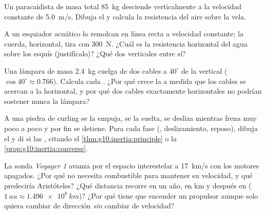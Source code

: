\begin{exercise}[$\star\star$]\label{exo:g10:inertia:10}
Un paracaidista de masa total \qty{85}{kg} desciende verticalmente a la
velocidad constante de \qty{5.0}{m/s}. Dibuja el  y
calcula la resistencia del aire sobre la vela.
\end{exercise}

\begin{exercise}[$\star\star$]\label{exo:g10:inertia:11}
A un esquiador acuático lo remolcan en línea recta a velocidad
constante; la cuerda, horizontal, tira con \qty{300}{N}. ¿Cuál es la
resistencia horizontal del agua sobre los esquís (justifícalo)? ¿Qué dos
 verticales  entre sí?
\end{exercise}

\begin{exercise}[$\star\star\star$]\label{exo:g10:inertia:12}
Una lámpara de masa \qty{2.4}{kg} cuelga de dos cables a $40^\circ$ de
la vertical ($\cos 40^\circ \approx 0.766$). Calcula cada . ¿Por
qué crece la  a medida que los cables se acercan a la horizontal,
y por qué dos cables exactamente horizontales no podrían sostener nunca
la lámpara?
\end{exercise}

\begin{exercise}[$\star\star\star$]\label{exo:g10:inertia:13}
A una piedra de curling se la empuja, se la suelta, se desliza mientras
frena muy poco a poco y por fin se detiene. Para cada fase (,
deslizamiento, reposo), dibuja el  y di si las
 , citando el \cref{thm:g10:inertia:principle} o la
\cref{prop:g10:inertia:converse}.
\end{exercise}

\begin{exercise}[$\star\star\star$]\label{exo:g10:inertia:14}
La sonda \emph{Voyager 1} avanza por el espacio interestelar a
\qty{17}{km/s} con los motores apagados. ¿Por qué no necesita
combustible para mantener su velocidad, y qué predeciría Aristóteles?
¿Qué distancia recorre en un año, en \unit{km} y después en  ($\qty{1}{au} \approx \qty{1.496e8}{km}$)? ¿Por qué tiene
que encender un propulsor aunque solo quiera cambiar de dirección
\emph{sin} cambiar de velocidad?
\end{exercise}

